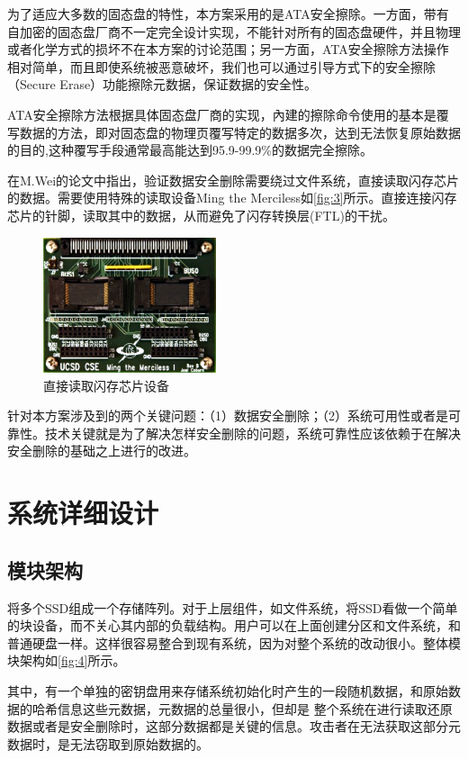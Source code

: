 为了适应大多数的固态盘的特性，本方案采用的是ATA安全擦除。一方面，带有自加密的固态盘厂商不一定完全设计实现，不能针对所有的固态盘硬件，并且物理或者化学方式的损坏不在本方案的讨论范围；另一方面，ATA安全擦除方法操作相对简单，而且即使系统被恶意破坏，我们也可以通过引导方式下的安全擦除（Secure Erase）功能擦除元数据，保证数据的安全性。


ATA安全擦除方法根据具体固态盘厂商的实现，內建的擦除命令使用的基本是覆写数据的方法，即对固态盘的物理页覆写特定的数据多次，达到无法恢复原始数据的目的,这种覆写手段通常最高能达到95.9-99.9\%的数据完全擦除\cite{Wei2011Reliably}。


在M.Wei的论文\cite{Wei2011Reliably}中指出，验证数据安全删除需要绕过文件系统，直接读取闪存芯片的数据。需要使用特殊的读取设备Ming the Merciless如\autoref{fig:3}所示。直接连接闪存芯片的针脚，读取其中的数据，从而避免了闪存转换层(FTL)的干扰。
\begin{figure}[H]
	\centering
	\includegraphics[width=2in]{Pics/ming.png}
	\caption{直接读取闪存芯片设备}
    \label{fig:3}
\end{figure}
针对本方案涉及到的两个关键问题：（1）数据安全删除；（2）系统可用性或者是可靠性。技术关键就是为了解决怎样安全删除的问题，系统可靠性应该依赖于在解决安全删除的基础之上进行的改进。
\section{系统详细设计}
\subsection{模块架构}
将多个SSD组成一个存储阵列。对于上层组件，如文件系统，将SSD看做一个简单的块设备，而不关心其内部的负载结构。用户可以在上面创建分区和文件系统，和普通硬盘一样。这样很容易整合到现有系统，因为对整个系统的改动很小。整体模块架构如\autoref{fig:4}所示。


其中，有一个单独的密钥盘用来存储系统初始化时产生的一段随机数据，和原始数据的哈希信息这些元数据，元数据的总量很小，但却是
整个系统在进行读取还原数据或者是安全删除时，这部分数据都是关键的信息。攻击者在无法获取这部分元数据时，是无法窃取到原始数据的。


